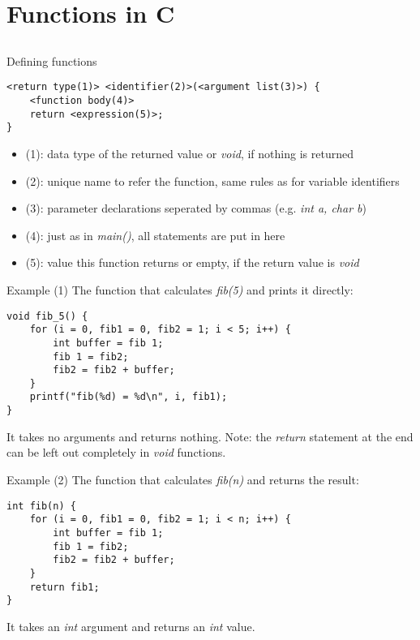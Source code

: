 \section{Functions in C}
\subsection{}
\begin{frame}[fragile]{Defining functions}
	\begin{lstlisting}[numbers=none]
<return type(1)> <identifier(2)>(<argument list(3)>) {
	<function body(4)>
	return <expression(5)>;
}
\end{lstlisting}
	\begin{itemize}
		\item (1): data type of the returned value or \textit{void}, if nothing is returned
		\item (2): unique name to refer the function, same rules as for variable identifiers
		\item (3): parameter declarations seperated by commas (e.g. \textit{int a, char b})
		\item (4): just as in \textit{main()}, all statements are put in here
		\item (5): value this function returns or empty, if the return value is \textit{void}
	\end{itemize}
\end{frame}
\begin{frame}[fragile]{Example (1)}
	The function that calculates \textit{fib(5)} and prints it directly:
	\begin{lstlisting}
void fib_5() {
	for (i = 0, fib1 = 0, fib2 = 1; i < 5; i++) {
		int buffer = fib 1;
		fib 1 = fib2;
		fib2 = fib2 + buffer;
	}
	printf("fib(%d) = %d\n", i, fib1);
}
\end{lstlisting}
	It takes no arguments and returns nothing.
	Note: the \textit{return} statement at the end can be left out completely in \textit{void} functions.
\end{frame}
\begin{frame}[fragile]{Example (2)}
	The function that calculates \textit{fib(n)} and returns the result:
	\begin{lstlisting}
int fib(n) {
	for (i = 0, fib1 = 0, fib2 = 1; i < n; i++) {
		int buffer = fib 1;
		fib 1 = fib2;
		fib2 = fib2 + buffer;
	}
	return fib1;
}
\end{lstlisting}
		It takes an \textit{int} argument and returns an \textit{int} value.
\end{frame}
